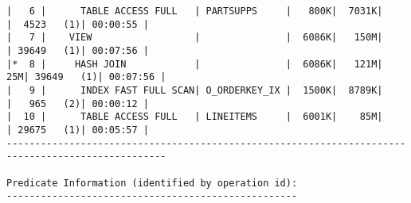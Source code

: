 \documentclass[11pt,a4paper,parskip=half]{scrartcl}
\begin{document}
\begin{lstlisting}
|   6 |      TABLE ACCESS FULL   | PARTSUPPS     |   800K|  7031K|       |  4523   (1)| 00:00:55 |                                                                                                                                                                                                           
|   7 |    VIEW                  |               |  6086K|   150M|       | 39649   (1)| 00:07:56 |                                                                                                                                                                                                           
|*  8 |     HASH JOIN            |               |  6086K|   121M|    25M| 39649   (1)| 00:07:56 |                                                                                                                                                                                                           
|   9 |      INDEX FAST FULL SCAN| O_ORDERKEY_IX |  1500K|  8789K|       |   965   (2)| 00:00:12 |                                                                                                                                                                                                           
|  10 |      TABLE ACCESS FULL   | LINEITEMS     |  6001K|    85M|       | 29675   (1)| 00:05:57 |                                                                                                                                                                                                           
--------------------------------------------------------------------------------------------------                                                                                                                                                                                                           
                                                                                                                                                                                                                                                                                                             
Predicate Information (identified by operation id):                                                                                                                                                                                                                                                          
---------------------------------------------------                                                                                                                                                                                                                                                          
                                                                                                                                                                                                                                                                                                             

\end{lstlisting}
\end{document}
